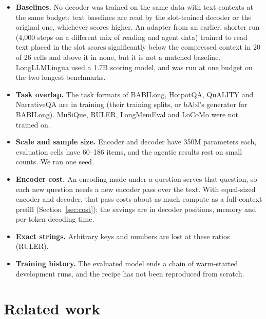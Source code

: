 \documentclass[11pt]{article}
\begin{document}
\begin{itemize}
\item \textbf{Baselines.} No decoder was trained on the same data with text contexts at the same
  budget; text baselines are read by the slot-trained decoder or the original one, whichever scores
  higher. An adapter from an earlier, shorter run (4{,}000 steps on a different mix of reading and
  agent data) trained to read text placed in the slot scores significantly below the compressed
  context in 20 of 26 cells and above it in none, but it is not a matched baseline. LongLLMLingua used
  a 1.7B scoring model, and was run at one budget on the two longest benchmarks.
\item \textbf{Task overlap.} The task formats of BABILong, HotpotQA, QuALITY and NarrativeQA are in
  training (their training splits, or bAbI's generator for BABILong). MuSiQue, RULER, LongMemEval and
  LoCoMo were not trained on.
\item \textbf{Scale and sample size.} Encoder and decoder have 350M parameters each, evaluation cells
  have 60--186 items, and the agentic results rest on small counts. We ran one seed.
\item \textbf{Encoder cost.} An encoding made under a question serves that question, so each new
  question needs a new encoder pass over the text. With equal-sized encoder and decoder, that pass
  costs about as much compute as a full-context prefill (Section~\ref{sec:cost}); the savings are in
  decoder positions, memory and per-token decoding time.
\item \textbf{Exact strings.} Arbitrary keys and numbers are lost at these ratios (RULER).
\item \textbf{Training history.} The evaluated model ends a chain of warm-started development runs,
  and the recipe has not been reproduced from scratch.
\end{itemize}

\section{Related work}
\end{document}
